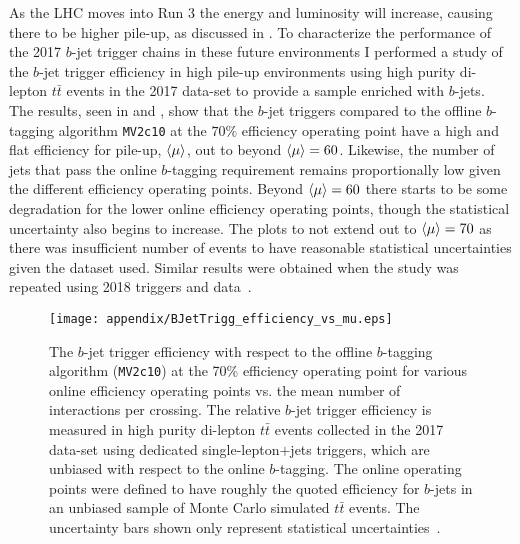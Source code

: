 As the LHC moves into Run 3 the energy and luminosity will increase, causing there to be higher pile-up, as discussed in .
To characterize the performance of the 2017 $b$-jet trigger chains in these future environments I performed a study of the $b$-jet trigger efficiency in high pile-up environments using high purity di-lepton $t\bar{t}$ events in the 2017 data-set to provide a sample enriched with $b$-jets.
The results, seen in  and , show that the $b$-jet triggers compared to the offline $b$-tagging algorithm \texttt{MV2c10} at the $70\%$ efficiency operating point have a high and flat efficiency for pile-up, $\braket{\mu}$, out to beyond $\braket{\mu}=60$.
Likewise, the number of jets that pass the online $b$-tagging requirement remains proportionally low given the different efficiency operating points.
Beyond $\braket{\mu}=60$ there starts to be some degradation for the lower online efficiency operating points, though the statistical uncertainty also begins to increase.
The plots to not extend out to $\braket{\mu}=70$ as there was insufficient number of events to have reasonable statistical uncertainties given the dataset used.
Similar results were obtained when the study was repeated using 2018 triggers and data~\cite{Sekula:2631805}.

\begin{figure}[htbp]
 \centering
 \texttt{[image: appendix/BJetTrigg\_efficiency\_vs\_mu.eps]}
 \caption[The $b$-jet trigger efficiency with respect to the offline $b$-tagging algorithm (\texttt{MV2c10}) at the 70\% efficiency operating point for various online efficiency operating points vs. the mean number of interactions per crossing.]{%
  The $b$-jet trigger efficiency with respect to the offline $b$-tagging algorithm (\texttt{MV2c10}) at the 70\% efficiency operating point for various online efficiency operating points vs. the mean number of interactions per crossing.
  The relative $b$-jet trigger efficiency is measured in high purity di-lepton $t\bar{t}$ events collected in the 2017 data-set using dedicated single-lepton$+$jets triggers, which are unbiased with respect to the online $b$-tagging.
  The online operating points were defined to have roughly the quoted efficiency for $b$-jets in an unbiased sample of Monte Carlo simulated $t\bar{t}$ events.
  The uncertainty bars shown only represent statistical uncertainties~\cite{Feickert:2294576}.}
 \label{fig:BJetTrigg_efficiency_vs_mu}
\end{figure}

